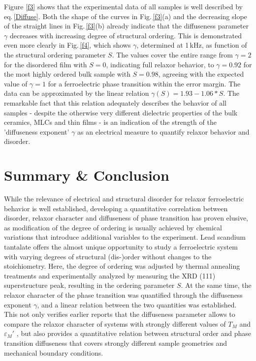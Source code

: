 \documentclass[%
 preprint, %
 amsmath,amssymb,
 aps, physrev,
]{revtex4-2}
\begin{document}
Figure \ref{f3} shows that the experimental data of all samples is well described by eq.\,\ref{Diffuse}. Both the shape of the curves in Fig.\,\ref{f3}(a) and the decreasing slope of the straight lines in Fig.\,\ref{f3}(b) already indicate that the diffuseness parameter $\gamma$ decreases with increasing degree of structural ordering. This is demonstrated even more clearly in Fig.\,\ref{f4}, which shows $\gamma$, determined at 1\,kHz, as function of the structural ordering parameter $S$. The values cover the entire range from $\gamma = 2$ for the disordered film with $S = 0$, indicating full relaxor behavior, to $\gamma = 0.92$ for the most highly ordered bulk sample with $S = 0.98$, agreeing with the expected value of $\gamma = 1$ for a ferroelectric phase transition within the error margin. The data can be approximated by the linear relation $\gamma(S) = 1.93 - 1.06*S$. The remarkable fact that this relation adequately describes the behavior of all samples - despite the otherwise very different dielectric properties of the bulk ceramics, MLCs and thin films - is an indication of the strength of the 'diffuseness exponent' $\gamma$ as an electrical measure to quantify relaxor behavior and disorder.

\section{Summary \& Conclusion}

While the relevance of electrical and structural disorder for relaxor ferroelectric behavior is well established, developing a quantitative correlation between disorder, relaxor character and diffuseness of phase transition has proven elusive, as modification of the degree of ordering is usually achieved by chemical variations that introduce additional variables to the experiment. Lead scandium tantalate offers the almost unique opportunity to study a ferroelectric system with varying degrees of structural (dis-)order without changes to the stoichiometry. Here, the degree of ordering was adjusted by thermal annealing treatments and experimentally analyzed by measuring the XRD (111) superstructure peak, resulting in the ordering parameter $S$. At the same time, the relaxor character of the phase transition was quantified through the diffuseness exponent $\gamma$, and a linear relation between the two quantities was established. This not only verifies earlier reports that the diffuseness parameter allows to compare the relaxor character of systems with strongly different values of $T_M$ and $\varepsilon_M'$ \cite{Baskaran01}, but also provides a quantitative relation between structural order and phase transition diffuseness that covers strongly different sample geometries and mechanical boundary conditions.
\end{document}
